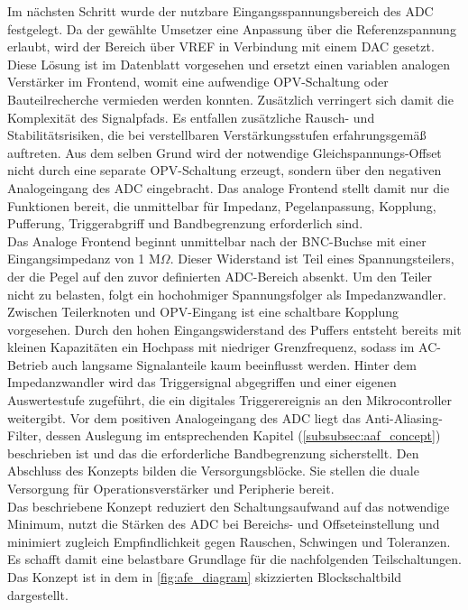 \documentclass[a4paper, portrait, 12pt]{scrartcl} %
\begin{document}
Im nächsten Schritt wurde der nutzbare Eingangsspannungsbereich des ADC festgelegt. Da der gewählte Umsetzer eine Anpassung über die Referenzspannung erlaubt, wird der Bereich über VREF in Verbindung mit einem DAC gesetzt. Diese Lösung ist im Datenblatt vorgesehen und ersetzt einen variablen analogen Verstärker im Frontend, womit eine aufwendige OPV-Schaltung oder Bauteilrecherche vermieden werden konnten. Zusätzlich verringert sich damit die Komplexität des Signalpfads. Es entfallen zusätzliche Rausch- und Stabilitätsrisiken, die bei verstellbaren Verstärkungsstufen erfahrungsgemäß auftreten. Aus dem selben Grund wird der notwendige Gleichspannungs-Offset nicht durch eine separate OPV-Schaltung erzeugt, sondern über den negativen Analogeingang des ADC eingebracht. Das analoge Frontend stellt damit nur die Funktionen bereit, die unmittelbar für Impedanz, Pegelanpassung, Kopplung, Pufferung, Triggerabgriff und Bandbegrenzung erforderlich sind.\\

Das Analoge Frontend beginnt unmittelbar nach der BNC-Buchse mit einer Eingangsimpedanz von 1 M$\Omega$. Dieser Widerstand ist Teil eines Spannungsteilers, der die Pegel auf den zuvor definierten ADC-Bereich absenkt. Um den Teiler nicht zu belasten, folgt ein hochohmiger Spannungsfolger als Impedanzwandler. Zwischen Teilerknoten und OPV-Eingang ist eine schaltbare Kopplung vorgesehen. Durch den hohen Eingangswiderstand des Puffers entsteht bereits mit kleinen Kapazitäten ein Hochpass mit niedriger Grenzfrequenz, sodass im AC-Betrieb auch langsame Signalanteile kaum beeinflusst werden. Hinter dem Impedanzwandler wird das Triggersignal abgegriffen und einer eigenen Auswertestufe zugeführt, die ein digitales Triggerereignis an den Mikrocontroller weitergibt. Vor dem positiven Analogeingang des ADC liegt das Anti-Aliasing-Filter, dessen Auslegung im entsprechenden Kapitel (\autoref{subsubsec:aaf_concept}) beschrieben ist und das die erforderliche Bandbegrenzung sicherstellt. Den Abschluss des Konzepts bilden die Versorgungsblöcke. Sie stellen die duale Versorgung für Operationsverstärker und Peripherie bereit.\\

Das beschriebene Konzept reduziert den Schaltungsaufwand auf das notwendige Minimum, nutzt die Stärken des ADC bei Bereichs- und Offseteinstellung und minimiert zugleich Empfindlichkeit gegen Rauschen, Schwingen und Toleranzen. Es schafft damit eine belastbare Grundlage für die nachfolgenden Teilschaltungen. Das Konzept ist in dem in \autoref{fig:afe_diagram} skizzierten Blockschaltbild dargestellt.
\end{document}
